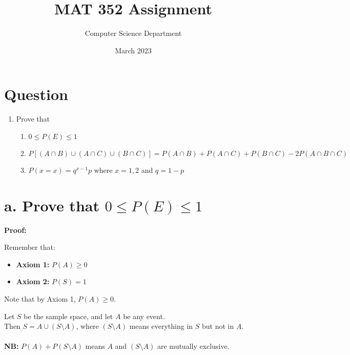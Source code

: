 \documentclass{article}
\title{MAT 352 Assignment}
\author{Computer Science Department}
\date{March 2023}
\begin{document}
\maketitle


\section*{Question}
\begin{enumerate}
    \item Prove that
        \begin{enumerate}[label=(\alph*)]
            \item $0 \leq P(E) \leq 1$
            \item $P[(A \cap B) \cup (A \cap C) \cup (B \cap C)] = P(A \cap B) + P(A \cap C) + P(B \cap C) - 2P(A \cap B \cap C)$
            \item $P(x=x) = q^{x-1}p$ where $x=1,2$ and $q = 1-p$
        \end{enumerate}
\end{enumerate}



\newpage

\section*{a. Prove that $0 \leq P(E) \leq 1$}

\textbf{Proof:}

Remember that:
\begin{itemize}
    \item \textbf{Axiom 1:} $P(A) \geq 0$
    \item \textbf{Axiom 2:} $P(S) = 1$
\end{itemize}

Note that by Axiom 1, $P(A) \geq 0$.

Let $S$ be the sample space, and let $A$ be any event.\\
Then $S = A \cup (S \setminus A)$, where $(S \setminus A)$ means everything in $S$ but not in $A$.
\\
\\
\textbf{NB:} $P(A) + P(S \setminus A)$ means $A$ and $(S \setminus A)$ are mutually exclusive.
\\
\\
\end{document}
